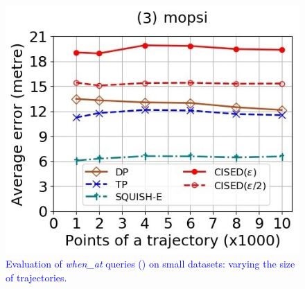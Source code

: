 \begin{figure}[tb!]
	\includegraphics[scale=0.400]{Figures/Exp-when-SED-error-size-mopsi.jpg}		
	\vspace{-2ex}
	\caption{\small \textcolor{blue}{Evaluation of \emph{when\_at} queries (\sed) on small datasets: varying the size of
		trajectories.}}
	\label{fig:query-when-sed-size}
	\vspace{-1ex}
\end{figure}



